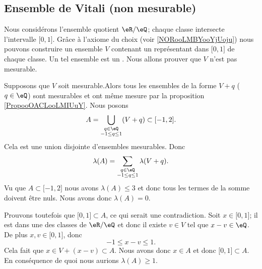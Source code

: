 \subsection{Ensemble de Vitali (non mesurable)}

\begin{example}      \label{EXooCZCFooRPgKjj}
    Nous considérons\cite{ooIARBooPdOgAQ} 
    l'ensemble quotient \( \eR/\eQ\); chaque classe intersecte l'intervalle \( \mathopen[ 0 , 1 \mathclose]\). Grâce à l'axiome du choix (voir \ref{NORooLMBYooYjUoju}) nous pouvons construire un ensemble \( V\) contenant un représentant dans \( \mathopen[ 0 , 1 \mathclose]\) de chaque classe. Un tel ensemble est un . Nous allons prouver que \( V\) n'est pas mesurable.

    Supposons que \( V\) soit mesurable.Alors tous les ensembles de la forme \( V+q\) (\( q\in \eQ\)) sont mesurables et ont même mesure par la proposition \ref{PropooOACLooLMIUuY}. Nous posons
    \begin{equation}
        A=\bigcup_{\substack{q\in\eQ\\-1\leq q\leq 1}}(V+q)\subset\mathopen[ -1 , 2 \mathclose].
    \end{equation}
    Cela est une union disjointe d'ensembles mesurables. Donc
    \begin{equation}
        \lambda(A)=\sum_{\substack{q\in\eQ\\-1\leq q\leq 1}}\lambda(V+q).
    \end{equation}
    Vu que \( A\subset\mathopen[ -1 , 2 \mathclose]\) nous avons \( \lambda(A)\leq 3\) et donc tous les termes de la somme doivent être nuls. Nous avons donc \( \lambda(A)=0\).

    Prouvons toutefois que \( \mathopen[ 0 , 1 \mathclose]\subset A\), ce qui serait une contradiction. Soit \( x\in\mathopen[ 0 , 1 \mathclose]\); il est dans une des classes de \( \eR/\eQ\) et donc il existe \( v\in V\) tel que \( x-v\in \eQ\). De plus \( x,v\in \mathopen[ 0 , 1 \mathclose]\), donc
    \begin{equation}
        -1\leq x-v\leq 1.
    \end{equation}
    Cela fait que \( x\in V+(x-v)\subset A\). Nous avons donc \( x\in A\) et donc \( \mathopen[ 0 , 1 \mathclose]\subset A\). En conséquence de quoi nous aurions \( \lambda(A)\geq 1\).
\end{example}

